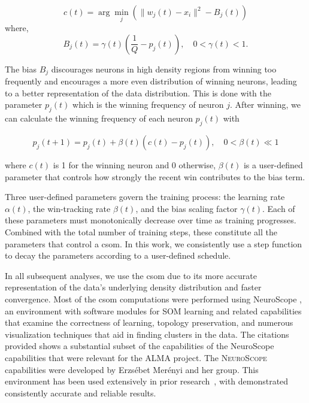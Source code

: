 \begin{equation}
c(t) = 
\arg\min_{j}( \|w_j(t) - x_i\|^2 - B_j(t))
\label{eq:csom_winner_selection}
\end{equation}
where,
\begin{equation}   
B_j(t) = \gamma(t) \left( \frac{1}{Q} - p_j(t) \right), \quad 0 < \gamma(t) < 1.
\end{equation}

The bias $B_j$ discourages neurons in high density regions from winning too frequently and encourages a more even distribution of winning neurons, leading to a better representation of the data distribution. This is done with the parameter $p_j(t)$ which is the winning frequency of neuron $j$. After winning, we can calculate the winning frequency of each neuron $p_j(t)$ with 

\begin{equation}
p_j(t+1) = p_j(t) + \beta(t) \left( c(t) - p_j(t) \right), \quad 0 < \beta(t) \ll 1
\end{equation}

\noindent where $c(t)$ is 1 for the winning neuron and 0 otherwise, $\beta(t)$ is a user-defined parameter that controls how strongly the recent win contributes to the bias term. 


Three user-defined parameters govern the training process: the learning rate $\alpha(t)$, the win-tracking rate $\beta(t)$, and the bias scaling factor $\gamma(t)$. Each of these parameters must monotonically decrease over time as training progresses. Combined with the total number of training steps, these constitute all the parameters that control a \acrshort{csom}. In this work, we consistently use a step function to decay the parameters according to a user-defined schedule. 

In all subsequent analyses, we use the \acrshort{csom} due to its more accurate representation of the data’s underlying density distribution and faster convergence. Most of the \acrshort{csom} computations were performed using NeuroScope \cite{Alma_NS, Alma_website}, an environment with software modules for SOM learning and related capabilities that examine the correctness of learning, topology preservation, and numerous visualization techniques that aid in finding clusters in the data. The citations provided  shows a substantial subset of the capabilities of the NeuroScope capabilities that were relevant for the ALMA project.
The \textsc{NeuroScope} capabilities were developed by Erzsébet Merényi and her group. This environment has been used extensively in prior research~\cite{merenyi2002, MERENYI1996280}, with demonstrated consistently accurate and reliable results. 

